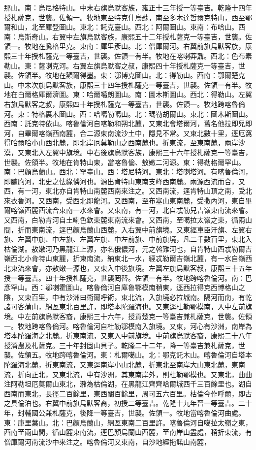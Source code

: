 \begin{pinyinscope}
那山。南：烏尼格特山。中末右旗烏默客族，雍正十三年授一等臺吉。乾隆十四年授札薩克，世襲。佐領一。牧地東至特克什烏蘇，南至多木達哲爾克特山，西至鄂爾和山，北至庫登圖山。東北：託克臺山。西北：阿爾圖山。東南：布哈山。西南：烏斯奇山。右翼中左旗烏默客族，康熙五十二年授札薩克一等臺吉，世襲。佐領一。牧地在騰格里克。東南：庫里彥山。北：僧庫爾河。右翼前旗烏默客族，康熙三十年授札薩克一等臺吉，世襲。佐領一有半。牧地在喀喇莽鼐。西北：色布素勒山。東：薩喇克河。右翼左旗烏默客之叔，康熙四十年授札薩克一等臺吉，世襲。佐領半。牧地在額爾得墨。東：鄂博克圖山。北：得勒山。西南：鄂爾楚克山。中末次旗烏默客族，康熙三十四年授札薩克一等臺吉，世襲。佐領一有半。牧地在白爾格庫爾濟圖。東：哈爾噶朗圖山。南：圖木斯圖山。西北：得勒山。左翼右旗烏默客之叔，康熙四十年授札薩克一等臺吉，世襲。佐領一。牧地跨喀魯倫河。東：特格裏木圖山。西：哈噶勒噶山。北：瑪勒胡爾山。東北：圖木斯圖山。西南：託克特依山。喀魯倫河自喀勒和朔北麓，又東北會塔爾河，舊名他拉即兒即河，自畢爾喀嶺西南麓，合二源東南流沙土中，隱見不常。又東北數十里，逕厄窩得哈爾哈小山西北麓，即北岸厄莫勒山之西南麓也。折東流，至東南麓，兩岸沙漠，又東北入左翼中旗境。中右後旗烏默客族，康熙三十六年授札薩克一等臺吉，世襲。佐領半。牧地在肯特山東，當喀魯倫、敖嫩二河源。東：得勒格爾罕山。南：巴顏烏蘭山。西北：罕臺山。西：塔尼特河。東北：塔喇塔河。有喀魯倫河，即臚朐河，北史之怯綠憐河也。源出肯特山東南支峰西南麓。兩源西流而合，又西，有一河，東北亦自肯特山南麓西南來注之。又西南流，逕肯特山頂之南，受北來衣魯河。又西南，受西北即龍河。又西南，至布塞山東南麓，受撒內河，東自畢爾喀嶺西麓西流合東南一水來會。又東南，有一河，北自忒勒兒吉嶺東南流來會。又西南，白勒肯河自土喇色欽東麓東南流來會。又西南，至噶拉太嶺之東，循兩山間，折而東南流，逕巴顏烏蘭山西麓，入右翼中前旗境。又東經車臣汗旗、左翼右旗、左翼中旗、中左旗、左翼左旗、中左前旗、中前旗境，凡二千數百里，東北入枯倫湖。敖嫩河乃黑龍江上源，亦名俄儂河，元之斡難河也，自肯特山西忒勒爾吉嶺西北小肯特山東麓，折東南流，納東北一水，經忒勒爾吉嶺北麓，有一水自嶺西北東流來會，亦敖嫩一源也，又東入中後旗境。左翼左旗烏默客叔，康熙三十五年授一等臺吉。四十年授札薩克，世襲罔替。佐領一有半。牧地跨喀魯倫河。南：巴彥罕山。西：鄂喇霍圖山。喀魯倫河自庫魯鄂模南稍東，逕西拉得克西博格山之陰，又東百里，中有沙洲曰術爾呼術，東北流，入旗境必拉城南。隔河而南，有乾諸可客蒲山，綿亙東北百里許，即塔本陀羅海也。又東逕杜勒鄂模南，入中左前旗境。中左前旗烏默客裔，康熙三十六年，授貢楚克一等臺吉兼札薩克，世襲。佐領一。牧地跨喀魯倫河。喀魯倫河自杜勒鄂模南入旗境。又東，河心有沙洲，南岸為塔本陀羅海之北麓。折東南流，又東入中前旗境。中前旗烏默客裔，康熙二十八年授濟農及札薩克。三十年封固山貝子。乾隆二十二年，降一等臺吉兼札薩克，世襲。佐領五。牧地跨喀魯倫河。東：札爾噶山。北：鄂克託木山。喀魯倫河自塔本陀羅海北麓，折東南流，又東逕南岸小山北麓，折東北至南岸大山東北麓，東南流，折向正北，又東北流，中有沙洲，其東南岸外，則杜勒鄂模也。又東北，曲曲注阿勒坦厄莫爾山東北，瀦為枯倫湖，在黑龍江齊齊哈爾城西千三百餘里也。湖自西南而東北，長徑二百餘里，東西闊百餘里，周可五六百里。枯倫今作呼爾，即古之具倫泊也。右翼中前旗烏默客裔，初授二等臺吉。乾隆十九年晉一等臺吉。二十年，封輔國公兼札薩克，後降一等臺吉，世襲。佐領一。牧地當喀魯倫河曲處。東：庫里葉山。北：巴顏烏蘭山，綿亙東南二百里許。喀魯倫河自噶拉太嶺之東，西南至兩山間，循山麓東南流，逕巴顏烏蘭山西麓，至南岸山盡處，稍折東流，有僧庫爾河南流沙中來注之。喀魯倫河又東南，自沙地經拖諾山南麓，
\end{pinyinscope}
